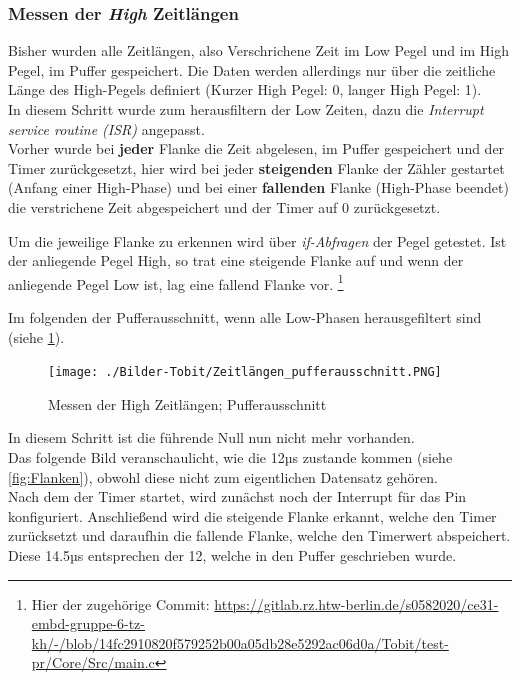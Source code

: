 \documentclass[11pt,a4paper,titlepage]{article}
\begin{document}
\subsubsection{Messen der \textit{High} Zeitlängen}
\label{sec:messen_zeitleangen}
Bisher wurden alle Zeitlängen, also Verschrichene Zeit im Low Pegel und im High Pegel, im Puffer gespeichert.
Die Daten werden allerdings nur über die zeitliche Länge des High-Pegels definiert (Kurzer High Pegel: 0, langer High Pegel: 1).\\
In diesem Schritt wurde zum herausfiltern der Low Zeiten, dazu die \textit{Interrupt service routine (ISR)} angepasst.\\

Vorher wurde bei \textbf{jeder} Flanke die Zeit abgelesen, im Puffer gespeichert und der Timer zurückgesetzt,
hier wird bei jeder \textbf{steigenden} Flanke der Zähler gestartet (Anfang einer High-Phase) und
bei einer \textbf{fallenden} Flanke (High-Phase beendet) die verstrichene Zeit abgespeichert und der Timer auf 0 zurückgesetzt.

Um die jeweilige Flanke zu erkennen wird über \textit{if-Abfragen} der Pegel getestet.
Ist der anliegende Pegel High, so trat eine steigende Flanke auf und wenn der anliegende Pegel Low ist, lag eine fallend Flanke vor.
\footnote{Hier der zugehörige Commit: \url{https://gitlab.rz.htw-berlin.de/s0582020/ce31-embd-gruppe-6-tz-kh/-/blob/14fc2910820f579252b00a05db28e5292ac06d0a/Tobit/test-pr/Core/Src/main.c}}

Im folgenden der Pufferausschnitt, wenn alle Low-Phasen herausgefiltert sind (siehe \cref{fig:Puffer_zeitleangen}).
\begin{figure}[H]
    \centering
    \texttt{[image: ./Bilder-Tobit/Zeitlängen\_pufferausschnitt.PNG]}
    \caption{Messen der High Zeitlängen; Pufferausschnitt}
    \label{fig:Puffer_zeitleangen}
\end{figure}

In diesem Schritt ist die führende Null nun nicht mehr vorhanden.\\

Das folgende Bild veranschaulicht, wie die 12µs zustande kommen (siehe \cref{fig:Flanken}),
obwohl diese nicht zum eigentlichen Datensatz gehören.\\
Nach dem der Timer startet, wird zunächst noch der Interrupt für das Pin konfiguriert.
Anschließend wird die steigende Flanke erkannt, welche den Timer zurücksetzt
und daraufhin die fallende Flanke, welche den Timerwert abspeichert.
Diese 14.5µs entsprechen der 12, welche in den Puffer geschrieben wurde.
\end{document}
